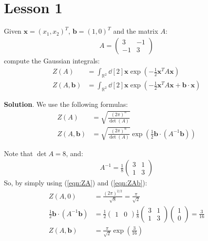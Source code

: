 \documentclass[../template.tex]{subfiles}
\begin{document}
\chapter{Lesson 1}
\begin{exo}
    Given $\bm{x} = (x_1,x_2)^T$, $\bm{b} = (1,0)^T$ and the matrix $A$:
    \begin{align*}
        A = \left(\begin{array}{cc}
        3 & -1 \\ 
        -1 & 3
        \end{array}\right)
    \end{align*}   
    compute the Gaussian integrals:
    \begin{align*}
        Z(A) &= \int_{\mathbb{R}^2} \dd[2]{\bm{x}} \exp\left(-\frac{1}{2} \bm{x}^T A \bm{x} \right) \\
        Z(A,\bm{b}) &= \int_{\mathbb{R}^2} \dd[2]{\bm{x}} \exp\left(-\frac{1}{2} \bm{x}^T A \bm{x} + \bm{b}\cdot \bm{x} \right)
    \end{align*}

    \medskip

    \textbf{Solution}. We use the following formulas:
    \begin{align*}
        Z(A) &= \sqrt{\frac{(2 \pi)^n}{\operatorname{det}(A)}}\\
        Z(A,\bm{b}) &= \sqrt{\frac{(2 \pi)^n}{\operatorname{det}(A)}} \exp\left(\frac{1}{2} \bm{b}\cdot (A^{-1}\bm{b}) \right)
    \end{align*}
   
    Note that $\operatorname{det}A = 8$, and:
    \begin{align*}
        A^{-1} = \frac{1}{8} \left(\begin{array}{cc}
        3 & 1 \\ 
        1 & 3
        \end{array}\right) 
    \end{align*} 
    So, by simply using (\ref{eqn:ZA}) and (\ref{eqn:ZAb}):
    \begin{align*}
        Z(A,0) &= \frac{(2\pi)^{2/2}}{\sqrt{8}} = \frac{\pi}{\sqrt{2}} \\
        \frac{1}{2} \bm{b}\cdot (A^{-1}\bm{b}) &=  \frac{1}{2} \left(\begin{array}{cc}
        1 & 0
        \end{array}\right) \frac{1}{8} \left(\begin{array}{cc}
        3 & 1 \\ 
        1 & 3
        \end{array}\right) \left(\begin{array}{c}
        1 \\ 
        0
        \end{array}\right) = \frac{3}{16} \\
        Z(A, \bm{b}) &= \frac{\pi}{\sqrt{2}} \exp\left(\frac{3}{16} \right)   
    \end{align*}
\end{exo}
\end{document}

